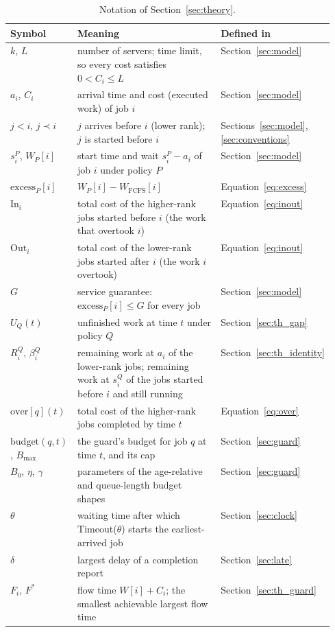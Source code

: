 \begin{table}[htbp]
\centering
\caption{Notation of Section~\ref{sec:theory}.}
\label{tab:notation}
\small
\begin{tabular}{lp{0.55\linewidth}l}
\toprule
Symbol & Meaning & Defined in \\
\midrule
$k$, $L$ & number of servers; time limit, so every cost satisfies $0 < C_i \le L$ & Section~\ref{sec:model} \\
$a_i$, $C_i$ & arrival time and cost (executed work) of job $i$ & Section~\ref{sec:model} \\
$j < i$, $j \prec i$ & $j$ arrives before $i$ (lower rank); $j$ is started before $i$ & Sections~\ref{sec:model}, \ref{sec:conventions} \\
$s^P_i$, $W_P[i]$ & start time and wait $s^P_i - a_i$ of job $i$ under policy $P$ & Section~\ref{sec:model} \\
$\mathrm{excess}_P[i]$ & $W_P[i] - W_{\mathrm{FCFS}}[i]$ & Equation~\eqref{eq:excess} \\
$\mathrm{In}_i$ & total cost of the higher-rank jobs started before $i$ (the work that overtook $i$) & Equation~\eqref{eq:inout} \\
$\mathrm{Out}_i$ & total cost of the lower-rank jobs started after $i$ (the work $i$ overtook) & Equation~\eqref{eq:inout} \\
$G$ & service guarantee: $\mathrm{excess}_P[i] \le G$ for every job & Section~\ref{sec:model} \\
$U_Q(t)$ & unfinished work at time $t$ under policy $Q$ & Section~\ref{sec:th_gap} \\
$R^Q_i$, $\beta^Q_i$ & remaining work at $a_i$ of the lower-rank jobs; remaining work at $s^Q_i$ of the jobs started before $i$ and still running & Section~\ref{sec:th_identity} \\
$\mathrm{over}[q](t)$ & total cost of the higher-rank jobs completed by time $t$ & Equation~\eqref{eq:over} \\
$\mathrm{budget}(q,t)$, $B_{\max}$ & the guard's budget for job $q$ at time $t$, and its cap & Section~\ref{sec:guard} \\
$B_0$, $\eta$, $\gamma$ & parameters of the age-relative and queue-length budget shapes & Section~\ref{sec:guard} \\
$\theta$ & waiting time after which Timeout($\theta$) starts the earliest-arrived job & Section~\ref{sec:clock} \\
$\delta$ & largest delay of a completion report & Section~\ref{sec:late} \\
$F_i$, $F^*$ & flow time $W[i] + C_i$; the smallest achievable largest flow time & Section~\ref{sec:th_guard} \\
\bottomrule
\end{tabular}
\end{table}

